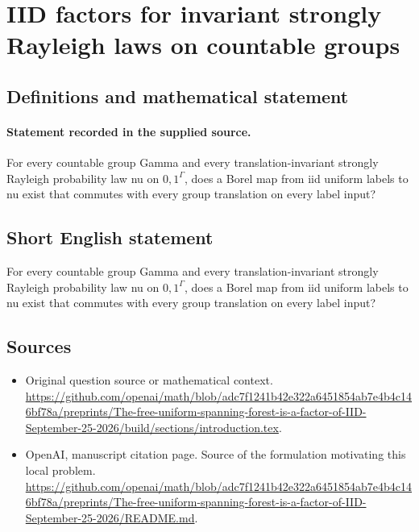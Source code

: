 \documentclass[11pt]{article}
\begin{document}
\section*{IID factors for invariant strongly Rayleigh laws on countable groups}\label{statement}
\subsection{Definitions and mathematical statement}
\paragraph{Statement recorded in the supplied source.}
For every countable group Gamma and every translation-invariant strongly Rayleigh probability law nu on ${0,1}^\Gamma $, does a Borel map from iid uniform labels to nu exist that commutes with every group translation on every label input?
\subsection{Short English statement}
For every countable group Gamma and every translation-invariant strongly Rayleigh probability law nu on ${0,1}^\Gamma $, does a Borel map from iid uniform labels to nu exist that commutes with every group translation on every label input?
\subsection{Sources}
\begin{itemize}
\item[S1] Original question source or mathematical context.
\url{https://github.com/openai/math/blob/adc7f1241b42e322a6451854ab7e4b4c146bf78a/preprints/The-free-uniform-spanning-forest-is-a-factor-of-IID-September-25-2026/build/sections/introduction.tex}.
\item[S2] OpenAI, manuscript citation page. Source of the formulation motivating this local problem.
\url{https://github.com/openai/math/blob/adc7f1241b42e322a6451854ab7e4b4c146bf78a/preprints/The-free-uniform-spanning-forest-is-a-factor-of-IID-September-25-2026/README.md}.
\end{itemize}
\end{document}
